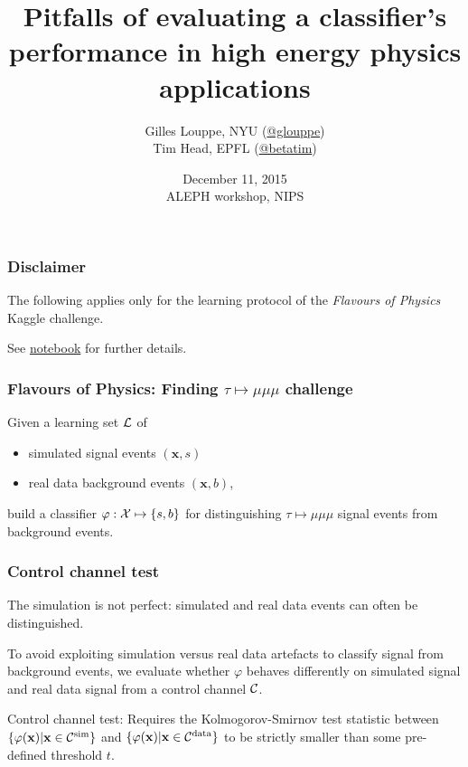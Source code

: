 \documentclass{beamer}
\title{{\bf Pitfalls of evaluating a classifier's performance in high energy physics applications}}
\author{
Gilles Louppe, NYU (\href{https://twitter.com/glouppe}{@glouppe}) \\
Tim Head, EPFL (\href{https://twitter.com/betatim}{@betatim}) \\
}
\date{December 11, 2015\\
ALEPH workshop, NIPS}
\begin{document}
\begin{frame}[plain]
\titlepage
\end{frame}

\begin{frame}
  \frametitle{Disclaimer}

The following applies {\color{red} only} for the learning protocol of the {\it
Flavours of Physics} Kaggle challenge.

\vspace{1cm}

See \href{https://github.com/glouppe/notebooks/blob/master/Classification\%20with\%20a\%20control\%20channel.ipynb}{notebook} for further details.

\end{frame}

\begin{frame}
  \frametitle{Flavours of Physics: Finding $\tau \mapsto \mu\mu\mu$ challenge}

Given a learning set ${\cal L}$ of

\vspace{0.5cm}

 \begin{itemize}
 \item simulated signal events $(\mathbf{x}, s)$
 \item real data background events $(\mathbf{x}, b)$,
 \end{itemize}

\vspace{0.5cm}

build a classifier $\varphi : {\cal X} \mapsto \{s, b\}$ for distinguishing
$\tau \mapsto \mu\mu\mu$ signal events from background events.

\end{frame}

\begin{frame}
  \frametitle{Control channel test}

The simulation is not perfect: {\color{red} simulated and real data events can often be distinguished}.

\vspace{1cm}

To avoid exploiting simulation versus real data artefacts to
classify signal from background events, we {\color{blue}evaluate whether $\varphi$ behaves
differently on simulated signal and real data signal from a control channel
${\cal C}$}.

\vspace{1cm}

Control channel test: Requires the Kolmogorov-Smirnov
test statistic between $\{ \varphi(\mathbf{x}) | \mathbf{x} \in {\cal
C}^\text{sim} \}$ and $\{ \varphi(\mathbf{x}) | \mathbf{x} \in {\cal
C}^\text{data} \}$ to be strictly smaller than some pre-defined threshold $t$.

\end{frame}
\end{document}
